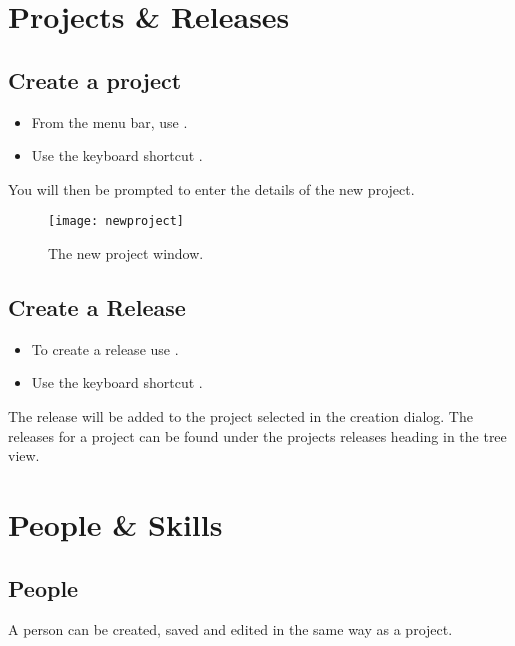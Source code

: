 \documentclass[11pt,fleqn]{book} %
\begin{document}
\section{Projects \& Releases}
\subsection{Create a project}
    \begin{itemize}
        \item From the menu bar, use .
        \item Use the keyboard shortcut .
    \end{itemize}
    You will then be prompted to enter the details of the new project.

    \begin{figure}[h]
        \centering
        \texttt{[image: newproject]}
        \caption{The new project window.\label{newproject}}
    \end{figure}

\subsection{Create a Release}
    \begin{itemize}
        \item To create a release use .
        \item Use the keyboard shortcut .
    \end{itemize}
    The release will be added to the project selected in the creation dialog.
    The releases for a project can be found under the projects releases heading in the tree view.

\section{People \& Skills}
\subsection{People}
A person can be created, saved and edited in the same way as a project.
\end{document}
